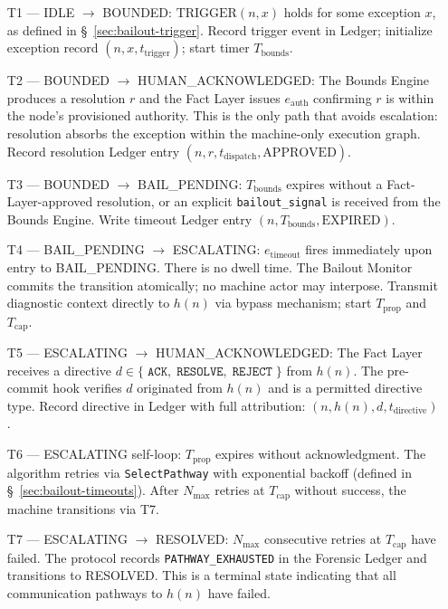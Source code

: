 \begin{enumerate}\itemsep=0pt
\item[T1 --- IDLE $\rightarrow$ BOUNDED:] $\text{TRIGGER}(n, x)$ holds for some exception $x$, as defined in \S~\ref{sec:bailout-trigger}. Record trigger event in Ledger; initialize exception record $(n, x, t_{\text{trigger}})$; start timer $T_{\text{bounds}}$.

\item[T2 --- BOUNDED $\rightarrow$ HUMAN\_ACKNOWLEDGED:] The Bounds Engine produces a resolution $r$ and the Fact Layer issues $e_{\text{auth}}$ confirming $r$ is within the node's provisioned authority. This is the only path that avoids escalation: resolution absorbs the exception within the machine-only execution graph. Record resolution Ledger entry $(n, r, t_{\text{dispatch}}, \text{APPROVED})$.

\item[T3 --- BOUNDED $\rightarrow$ BAIL\_PENDING:] $T_{\text{bounds}}$ expires without a Fact-Layer-approved resolution, or an explicit \texttt{bailout\_signal} is received from the Bounds Engine. Write timeout Ledger entry $(n, T_{\text{bounds}}, \text{EXPIRED})$.

\item[T4 --- BAIL\_PENDING $\rightarrow$ ESCALATING:] $e_{\text{timeout}}$ fires immediately upon entry to BAIL\_PENDING. There is no dwell time. The Bailout Monitor commits the transition atomically; no machine actor may interpose. Transmit diagnostic context directly to $h(n)$ via bypass mechanism; start $T_{\text{prop}}$ and $T_{\text{cap}}$.

\item[T5 --- ESCALATING $\rightarrow$ HUMAN\_ACKNOWLEDGED:] The Fact Layer receives a directive $d \in \{\;\texttt{ACK},\; \texttt{RESOLVE},\; \texttt{REJECT}\;\}$ from $h(n)$. The pre-commit hook verifies $d$ originated from $h(n)$ and is a permitted directive type. Record directive in Ledger with full attribution: $(n, h(n), d, t_{\text{directive}})$.

\item[T6 --- ESCALATING self-loop:] $T_{\text{prop}}$ expires without acknowledgment. The algorithm retries via \texttt{SelectPathway} with exponential backoff (defined in \S~\ref{sec:bailout-timeouts}). After $N_{\max}$ retries at $T_{\text{cap}}$ without success, the machine transitions via T7.

\item[T7 --- ESCALATING $\rightarrow$ RESOLVED:] $N_{\max}$ consecutive retries at $T_{\text{cap}}$ have failed. The protocol records \texttt{PATHWAY\_EXHAUSTED} in the Forensic Ledger and transitions to RESOLVED. This is a terminal state indicating that all communication pathways to $h(n)$ have failed.


\end{enumerate}
